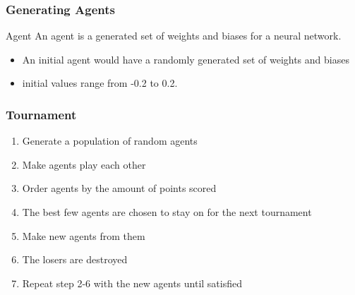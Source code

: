 \documentclass[aspectratio=169]{beamer}
\begin{document}
	\begin{frame}
		\frametitle{Generating Agents}
		\begin{block}{Agent}
			An agent is a generated set of weights and biases for a neural network.
		\end{block}

		\begin{itemize}
			\item An initial agent would have a randomly generated set of weights and biases
			\item initial values range from -0.2 to 0.2.
		\end{itemize}
	\end{frame}

	\begin{frame}
		\frametitle{Tournament}
		\begin{enumerate}
			\item Generate a population of random agents
			\item Make agents play each other
			\item Order agents by the amount of points scored
			\item The best few agents are chosen to stay on for the next tournament
			\item Make new agents from them
			\item The losers are destroyed
			\item Repeat step 2-6 with the new agents until satisfied
		\end{enumerate}
	\end{frame}

\end{document}
